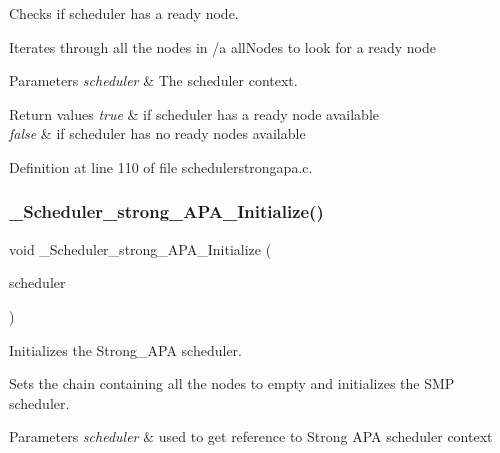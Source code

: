 Checks if scheduler has a ready node. 

Iterates through all the nodes in /a all\+Nodes to look for a ready node


\begin{DoxyParams}{Parameters}
{\em scheduler} & The scheduler context. \\
\hline
\end{DoxyParams}

\begin{DoxyRetVals}{Return values}
{\em true} & if scheduler has a ready node available \\
\hline
{\em false} & if scheduler has no ready nodes available \\
\hline
\end{DoxyRetVals}


Definition at line 110 of file schedulerstrongapa.\+c.

\mbox{\label{group__RTEMSScoreSchedulerStrongAPA_gafcd6fde337d7542784698219322b6365}} 
\subsubsection{\texorpdfstring{\+\_\+\+Scheduler\+\_\+strong\+\_\+\+A\+P\+A\+\_\+\+Initialize()}{\_Scheduler\_strong\_APA\_Initialize()}}
{\footnotesize\ttfamily void \+\_\+\+Scheduler\+\_\+strong\+\_\+\+A\+P\+A\+\_\+\+Initialize (\begin{DoxyParamCaption}\item[{const Scheduler\+\_\+\+Control $\ast$}]{scheduler }\end{DoxyParamCaption})}



Initializes the Strong\+\_\+\+A\+PA scheduler. 

Sets the chain containing all the nodes to empty and initializes the S\+MP scheduler.


\begin{DoxyParams}{Parameters}
{\em scheduler} & used to get reference to Strong A\+PA scheduler context \\
\hline
\end{DoxyParams}

